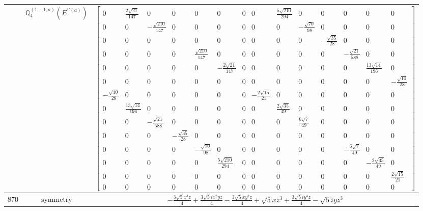 \documentclass[fleqn,8pt,landscape]{jsarticle}
\begin{document}
\begin{longtable}{ccc}
$  $ & $ \mathbb{Q}_{4}^{(1,-1;a)}(E^{\prime\prime(a)}) $ & $ \begin{bmatrix} 0 & \frac{2 \sqrt{21}}{147} & 0 & 0 & 0 & 0 & 0 & 0 & \frac{5 \sqrt{210}}{294} & 0 & 0 & 0 & 0 & 0 \\ 0 & 0 & - \frac{\sqrt{210}}{147} & 0 & 0 & 0 & 0 & 0 & 0 & - \frac{\sqrt{70}}{98} & 0 & 0 & 0 & 0 \\ 0 & 0 & 0 & 0 & 0 & 0 & 0 & 0 & 0 & 0 & - \frac{\sqrt{35}}{28} & 0 & 0 & 0 \\ 0 & 0 & 0 & 0 & \frac{\sqrt{210}}{147} & 0 & 0 & 0 & 0 & 0 & 0 & - \frac{\sqrt{21}}{588} & 0 & 0 \\ 0 & 0 & 0 & 0 & 0 & - \frac{2 \sqrt{21}}{147} & 0 & 0 & 0 & 0 & 0 & 0 & \frac{13 \sqrt{14}}{196} & 0 \\ 0 & 0 & 0 & 0 & 0 & 0 & 0 & 0 & 0 & 0 & 0 & 0 & 0 & - \frac{\sqrt{10}}{28} \\ - \frac{\sqrt{10}}{28} & 0 & 0 & 0 & 0 & 0 & 0 & - \frac{2 \sqrt{15}}{21} & 0 & 0 & 0 & 0 & 0 & 0 \\ 0 & \frac{13 \sqrt{14}}{196} & 0 & 0 & 0 & 0 & 0 & 0 & \frac{2 \sqrt{35}}{49} & 0 & 0 & 0 & 0 & 0 \\ 0 & 0 & - \frac{\sqrt{21}}{588} & 0 & 0 & 0 & 0 & 0 & 0 & \frac{6 \sqrt{7}}{49} & 0 & 0 & 0 & 0 \\ 0 & 0 & 0 & - \frac{\sqrt{35}}{28} & 0 & 0 & 0 & 0 & 0 & 0 & 0 & 0 & 0 & 0 \\ 0 & 0 & 0 & 0 & - \frac{\sqrt{70}}{98} & 0 & 0 & 0 & 0 & 0 & 0 & - \frac{6 \sqrt{7}}{49} & 0 & 0 \\ 0 & 0 & 0 & 0 & 0 & \frac{5 \sqrt{210}}{294} & 0 & 0 & 0 & 0 & 0 & 0 & - \frac{2 \sqrt{35}}{49} & 0 \\ 0 & 0 & 0 & 0 & 0 & 0 & 0 & 0 & 0 & 0 & 0 & 0 & 0 & \frac{2 \sqrt{15}}{21} \\ 0 & 0 & 0 & 0 & 0 & 0 & 0 & 0 & 0 & 0 & 0 & 0 & 0 & 0 \end{bmatrix} $ \\ \hline
$ 870 $ & $ \text{symmetry} $ & $ - \frac{3 \sqrt{5} x^{3} z}{4} + \frac{3 \sqrt{5} i x^{2} y z}{4} - \frac{3 \sqrt{5} x y^{2} z}{4} + \sqrt{5} x z^{3} + \frac{3 \sqrt{5} i y^{3} z}{4} - \sqrt{5} i y z^{3} $ \\

\end{longtable}
\end{document}
